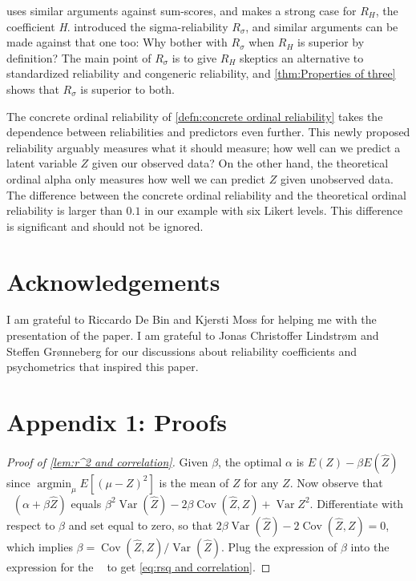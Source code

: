 \documentclass[twoside]{article}
\DeclareMathOperator{\Var}{Var}
\DeclareMathOperator{\argmin}{argmin}
\DeclareMathOperator{\Cov}{Cov}
\DeclareMathOperator{\MSE}{MSE_Z}
\begin{document}
\citet{McNeish2019-ea} uses similar arguments against sum-scores, and makes a strong case for $ R_H$, the coefficient \textit{H}.  introduced the sigma-reliability $ R_\sigma$, and similar arguments can be made against that one too: Why bother with $ R_\sigma$ when $ R_H$ is superior by definition? The main point of $ R_\sigma$ is to give $ R_H$ skeptics an alternative to standardized reliability and congeneric reliability, and \cref{thm:Properties of three} shows that $ R_\sigma$ is superior to both. 

The concrete ordinal reliability of \cref{defn:concrete ordinal reliability} takes the dependence between reliabilities and predictors even further. This newly proposed reliability arguably measures what it should measure; how well can we predict a latent variable $Z$ given our observed data? On the other hand, the theoretical ordinal alpha only measures how well we can predict $Z$ given unobserved data. The difference between the concrete ordinal reliability and the theoretical ordinal reliability is larger than $0.1$ in our example with six Likert levels. This difference is significant and should not be ignored.

\section{Acknowledgements}
I am grateful to Riccardo De Bin and Kjersti Moss for helping me with the presentation of the paper. I am grateful to Jonas Christoffer Lindstrøm and Steffen Grønneberg for our discussions about reliability coefficients and psychometrics that inspired this paper.

\clearpage
\section*{Appendix 1: Proofs}
\label{Appendix 1}

\begin{proof}[Proof of \cref{lem:r^2 and correlation}]\label{proof:r^2 and correlation}
Given $\beta$, the optimal $\alpha$ is $E(Z) - \beta E(\hat{Z})$ since $\argmin_\mu E[(\mu-Z)^2]$ is the mean of $Z$ for any $Z$. Now observe that $\MSE(\alpha+\beta\hat{Z})$ equals $\beta^{2}\Var(\hat{Z})-2\beta\Cov(\hat{Z},Z)+\Var Z^{2}$.
Differentiate with respect to $\beta$ and set equal to zero, so that
$2\beta\Var(\hat{Z})-2\Cov(\hat{Z},Z)=0$, which implies $\beta=\Cov(\hat{Z},Z)/\Var(\hat{Z})$. Plug the expression of $\beta$ into the expression for the $\MSE$ to get \cref{eq:rsq and correlation}.
\end{proof}
\end{document}

